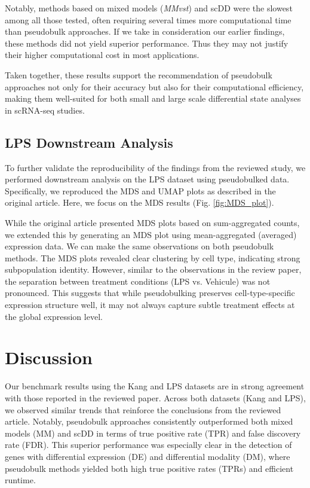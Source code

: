 \documentclass[a4paper, 11pt, twocolumn]{article}
\begin{document}
\begin{multicols}{2}
Notably, methods based on mixed models (\textit{MMvst}) and scDD were the slowest among all those tested, often requiring several times more computational time than pseudobulk approaches. If we take in consideration our earlier findings, these methods did not yield superior performance. Thus they may not justify their higher computational cost in most applications.

Taken together, these results support the recommendation of pseudobulk approaches not only for their accuracy but also for their computational efficiency, making them well-suited for both small and large scale differential state analyses in scRNA-seq studies.

\subsection{LPS Downstream Analysis}

To further validate the reproducibility of the findings from the reviewed study, we performed downstream analysis on the LPS dataset using pseudobulked data. Specifically, we reproduced the MDS and UMAP plots as described in the original article. Here, we focus on the MDS results (Fig. \ref{fig:MDS_plot}).

While the original article presented MDS plots based on sum-aggregated counts, we extended this by generating an MDS plot using mean-aggregated (averaged) expression data. We can make the same observations on both pseudobulk methods. The MDS plots revealed clear clustering by cell type, indicating strong subpopulation identity. However, similar to the observations in the review paper, the separation between treatment conditions (LPS vs. Vehicule) was not pronounced. This suggests that while pseudobulking preserves cell-type-specific expression structure well, it may not always capture subtle treatment effects at the global expression level.

\section{Discussion}

Our benchmark results using the Kang and LPS datasets are in strong agreement with those reported in the reviewed paper. Across both datasets (Kang and LPS), we observed similar trends that reinforce the conclusions from the reviewed article. Notably, pseudobulk approaches consistently outperformed both mixed models (MM) and scDD in terms of true positive rate (TPR) and false discovery rate (FDR). This superior performance was especially clear in the detection of genes with differential expression (DE) and differential modality (DM), where pseudobulk methods yielded both high true positive rates (TPRs) and efficient runtime.


\end{multicols}
\end{document}
